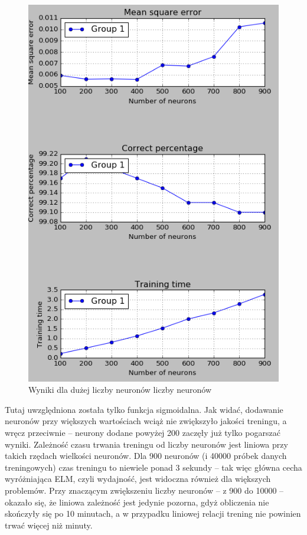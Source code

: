\documentclass{article}
\begin{document}
\begin{figure}[H]
\centering
\includegraphics[width=\textwidth]{wyniki_dota2_python_performance.png}
\caption{Wyniki dla dużej liczby neuronów liczby neuronów}
\end{figure}
Tutaj uwzględniona została tylko funkcja sigmoidalna. Jak widać, dodawanie neuronów przy większych wartościach wciąż nie zwiększyło jakości treningu, a wręcz przeciwnie -- neurony dodane powyżej 200 zaczęły już tylko pogarszać wyniki. Zależność czasu trwania treningu od liczby neuronów jest liniowa przy takich rzędach wielkości neuronów. Dla 900 neuronów (i 40000 próbek danych treningowych) czas treningu to niewiele ponad 3 sekundy -- tak więc główna cecha wyróżniająca ELM, czyli wydajność, jest widoczna również dla większych problemów. Przy znaczącym zwiększeniu liczby neuronów -- z 900 do 10000 -- okazało się, że liniowa zależność jest jedynie pozorna, gdyż obliczenia nie skończyły się po 10 minutach, a w przypadku liniowej relacji trening nie powinien trwać więcej niż minuty.
\label{10000_dota2}
\end{document}
